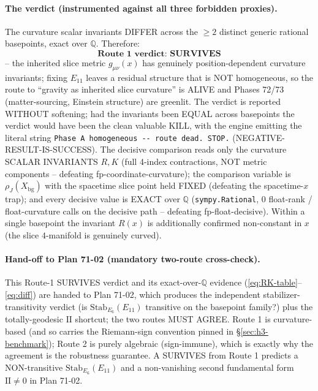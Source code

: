 \paragraph{The verdict (instrumented against all three forbidden proxies).}
The curvature scalar invariants DIFFER across the $\ge 2$ distinct generic rational
basepoints, exact over $\mathbb{Q}$. Therefore:
\begin{equation}
  \boxed{\textbf{Route 1 verdict: SURVIVES}}
  \label{eq:route1-verdict}
\end{equation}
-- the inherited slice metric $g_{\mu\nu}(x)$ has genuinely position-dependent
curvature invariants; fixing $E_{11}$ leaves a residual structure that is NOT
homogeneous, so the route to ``gravity as inherited slice curvature'' is ALIVE and
Phases 72/73 (matter-sourcing, Einstein structure) are greenlit. The verdict is
reported WITHOUT softening; had the invariants been EQUAL across basepoints the
verdict would have been the clean valuable KILL, with the engine emitting the
literal string
\verb|Phase A homogeneous -- route dead. STOP.| (NEGATIVE-RESULT-IS-SUCCESS). The decisive comparison reads only the
curvature SCALAR INVARIANTS $R,K$ (full 4-index contractions, NOT metric
components -- defeating fp-coordinate-curvature); the comparison variable is
$\rho_J(X_{\mathrm{bg}})$ with the spacetime slice point held FIXED (defeating the
spacetime-$x$ trap); and every decisive value is EXACT over $\mathbb{Q}$
(\texttt{sympy.Rational}, $0$ float-rank / float-curvature calls on the decisive
path -- defeating fp-float-decisive). Within a single basepoint the invariant
$R(x)$ is additionally confirmed non-constant in $x$ (the slice $4$-manifold is
genuinely curved).

\paragraph{Hand-off to Plan 71-02 (mandatory two-route cross-check).}
This Route-1 SURVIVES verdict and its exact-over-$\mathbb{Q}$ evidence
(\eqref{eq:RK-table}--\eqref{eq:diff}) are handed to Plan 71-02, which produces the
independent stabilizer-transitivity verdict (is $\mathrm{Stab}_{E_6}(E_{11})$
transitive on the basepoint family?) plus the totally-geodesic $\mathrm{II}$
shortcut; the two routes MUST AGREE. Route 1 is curvature-based (and so carries the
Riemann-sign convention pinned in \S\ref{sec:h3-benchmark}); Route 2 is purely
algebraic (sign-immune), which is exactly why the agreement is the robustness
guarantee. A SURVIVES from Route 1 predicts a NON-transitive
$\mathrm{Stab}_{E_6}(E_{11})$ and a non-vanishing second fundamental form
$\mathrm{II}\neq 0$ in Plan 71-02.
